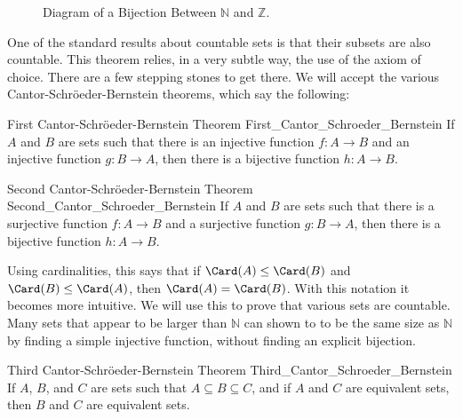     \begin{figure}[H]
        \centering
        \captionsetup{type=figure}
        
        \caption{Diagram of a Bijection Between
                 $\mathbb{N}$ and $\mathbb{Z}$.}
        \label{fig:Bijection_N_and_Z}
    \end{figure}
    One of the standard results about countable sets is
    that their subsets are also countable. This theorem
    relies, in a very subtle way, the use of the axiom
    of choice. There are a few stepping stones to get
    there. We will accept the various
    Cantor-Schr\"{o}eder-Bernstein theorems, which say
    the following:
    \begin{ltheorem}
          {First Cantor-Schr\"{o}eder-Bernstein Theorem}
          {First_Cantor_Schroeder_Bernstein}
        If $A$ and $B$ are sets such that there is an injective
        function $f:A\rightarrow{B}$ and an injective function
        $g:B\rightarrow{A}$, then there is a bijective function
        $h:A\rightarrow{B}$.
    \end{ltheorem}
    \begin{ltheorem}
          {Second Cantor-Schr\"{o}eder-Bernstein Theorem}
          {Second_Cantor_Schroeder_Bernstein}
        If $A$ and $B$ are sets such that there is a surjective
        function $f:A\rightarrow{B}$ and a surjective function
        $g:B\rightarrow{A}$, then there is a bijective function
        $h:A\rightarrow{B}$.
    \end{ltheorem}
    \par\hfill\par
    Using cardinalities, this says that if
    $\Card(A)\leq\Card(B)$ and $\Card(B)\leq\Card(A)$, then
    $\Card(A)=\Card(B)$. With this notation it becomes more
    intuitive. We will use this to prove that various sets are
    countable. Many sets that appear to be larger than $\mathbb{N}$
    can shown to to be the same size as $\mathbb{N}$ by finding
    a simple injective function, without finding an explicit
    bijection.
    \begin{ltheorem}
          {Third Cantor-Schr\"{o}eder-Bernstein Theorem}
          {Third_Cantor_Schroeder_Bernstein}
        If $A$, $B$, and $C$ are sets such that
        $A\subseteq{B}\subseteq{C}$, and if $A$ and $C$ are equivalent
        sets, then $B$ and $C$ are equivalent sets.
    \end{ltheorem}
    \par\hfill\par
